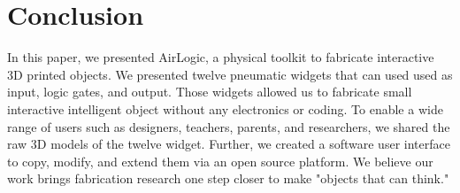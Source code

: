   \section{Conclusion}
    In this paper, we presented AirLogic, a physical toolkit to fabricate
    interactive 3D printed objects. We presented twelve pneumatic widgets that
    can used used as input, logic gates, and output. Those widgets allowed us to
    fabricate small interactive intelligent object without any electronics or
    coding. To enable a wide range of users such as designers, teachers,
    parents, and researchers, we shared the raw 3D models of the twelve widget.
    Further, we created a software user interface to copy, modify, and extend
    them via an open source platform. We believe our work brings fabrication
    research one step closer to make "objects that can think."